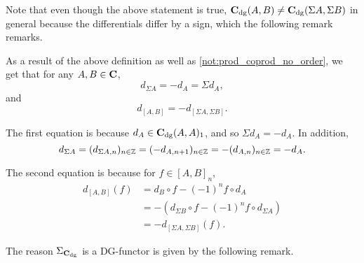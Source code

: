 Note that even though the above statement is true, \( \operatorname{\mathbf{C}}_{\operatorname{dg}}(A, B) \neq \operatorname{\mathbf{C}}_{\operatorname{dg}}(\Sigma A, \Sigma B) \) in general because the differentials differ by a sign, which the following remark remarks.

\begin{remark}
    \label{rem:c_dg_sigma_d_equal_minus_d}
    As a result of the above definition as well as \autoref{not:prod_coprod_no_order}, we get that for any \( A, B \in \operatorname{\mathbf{C}} \),
    \[
        d_{\Sigma A} = - d_A = \Sigma d_A,
    \]
    and
    \[
        d_{[A, B]} = - d_{[\Sigma A, \Sigma B]}.
    \]

    The first equation is because \( d_A \in \operatorname{\mathbf{C}}_{\operatorname{dg}}(A, A)_1 \), and so \( \Sigma d_A = - d_A \). In addition,
    \[
        d_{\Sigma A} = (d_{\Sigma A, n})_{n \in {\mathbb{Z}}} = (- d_{A, n + 1})_{n \in {\mathbb{Z}}} = - (d_{A, n})_{n \in {\mathbb{Z}}} = - d_A.
    \]

    The second equation is because for \( f \in [A, B]_n \),
    \begin{align*}
        d_{[A, B]} (f) &= d_B \circ f - (-1)^n f \circ d_A \\
        &= - (d_{\Sigma B} \circ f - (-1)^n f \circ d_{\Sigma A}) \\
        &= - d_{[\Sigma A, \Sigma B]} (f).
    \end{align*}
\end{remark}

The reason \( \Sigma_{\operatorname{\mathbf{C}}_{\operatorname{dg}}} \) is a DG-functor is given by the following remark. 

